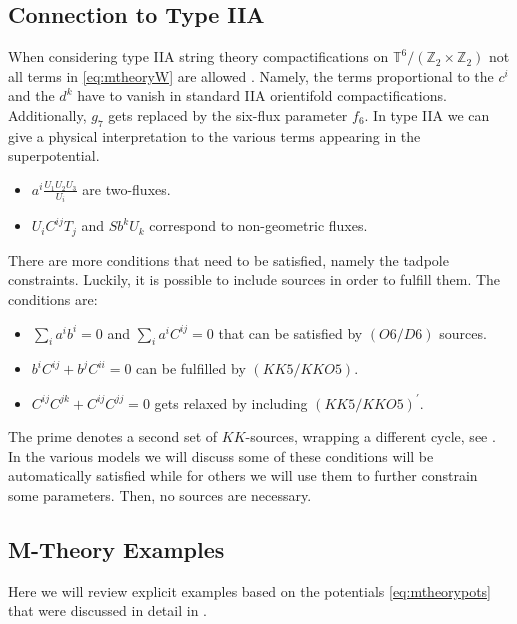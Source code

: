 \documentclass[a4paper,12pt,twoside,openright]{report}
\begin{document}
\subsection{Connection to Type IIA}
\label{sec:IIAconn}
When considering type IIA string theory compactifications on $\mathbb{T}^6/(\mathbb{Z}_2 \times \mathbb{Z}_2)$ not all terms in \ref{eq:mtheoryW} are allowed \cite{Derendinger:2014wwa,Blaback:2018hdo,Villadoro:2007yq}. Namely, the terms proportional to the $c^i$ and the $d^k$ have to vanish in standard IIA orientifold compactifications. Additionally, $g_7$ gets replaced by the six-flux parameter $f_6$. In type IIA  we can give a physical interpretation to the various terms appearing in the superpotential. 
\begin{itemize}
\item $a^i \frac{U_1 U_2 U_3}{U_i}$ are two-fluxes.
\item $U_i C^{ij} T_j$ and $S b^k U_k$ correspond to non-geometric fluxes.
\end{itemize}
There are more conditions that need to be satisfied, namely the tadpole constraints. Luckily, it is possible to include sources in order to fulfill them. The conditions are:
\begin{itemize}
\item $\sum_i a^i b^i = 0$ and $\sum_i a^i C^{ij} = 0$ that can be satisfied by $(O6/D6)$ sources.
\item $b^i C^{ij} + b^j C^{ii} = 0$ can be fulfilled by $(KK5/KKO5)$.
\item $C^{ij}C^{jk} + C^{ij} C^{jj} = 0$ gets relaxed by including $(KK5/KKO5)^\prime$.
\end{itemize}
The prime denotes a second set of $KK$-sources, wrapping a different cycle, see \cite{Blaback:2018hdo}.\\
In the various models we will discuss some of these conditions will be automatically satisfied while for others we will use them to further constrain some parameters. Then, no sources are necessary. 

\subsection{M-Theory Examples}
\label{sec:mtheoryexamples}
Here we will review explicit examples based on the potentials \eqref{eq:mtheorypots} that were discussed in detail in \cite{Cribiori:2019hrb}.
\end{document}
